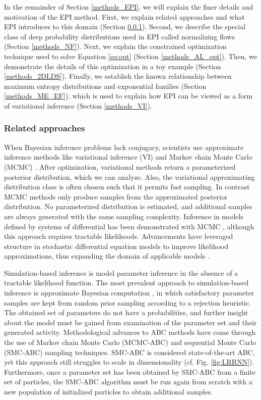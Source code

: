 \documentclass[11pt]{article}
\begin{document}
In the remainder of Section \ref{methods_EPI}, we will explain the finer details and motivation of the EPI method. 
First, we explain related approaches and what EPI introduces to this domain (Section \ref{methods_related}).
Second, we describe the special class of deep probability distributions used in EPI called normalizing flows (Section \ref{methods_NF}).  
Next, we explain the constrained optimization technique used to solve Equation \ref{eq:opt} (Section \ref{methods_AL_opt}).
Then, we demonstrate the details of this optimization in a toy example (Section \ref{methods_2DLDS}).
Finally, we establish the known relationship between maximum entropy distributions and exponential families (Section \ref{methods_ME_EF}), which is used to explain how EPI can be viewed as a form of variational inference (Section \ref{methods_VI}).

 \subsubsection{Related approaches}\label{methods_related}
 When Bayesian inference problems lack conjugacy, scientists use approximate inference methods like variational inference (VI) \cite{saul1998mean} and Markov chain Monte Carlo (MCMC) \cite{metropolis1953equation, hastings1970monte}. 
After optimization, variational methods return a parameterized posterior distribution, which we can analyze.
Also, the variational approximating distribution class is often chosen such that it permits fast sampling.
In contrast MCMC methods only produce samples from the approximated posterior distribution.
No parameterized distribution is estimated, and additional samples are always generated with the same sampling complexity.
Inference in models defined by systems of differential has been demonstrated with MCMC \cite{girolami2011riemann}, although this approach requires tractable likelihoods.
Advancements have leveraged structure in stochastic differential equation models to improve likelihood approximations, thus expanding the domain of applicable models \cite{golightly2011bayesian}.
 
Simulation-based inference \cite{cranmer2020frontier} is model parameter inference in the absence of a tractable likelihood function.
The most prevalent approach to simulation-based inference is approximate Bayesian computation \cite{beaumont2002approximate}, in which satisfactory parameter samples are kept from random prior sampling according to a rejection heuristic.
The obtained set of parameters do not have a probabilities, and further insight about the model must be gained from examination of the parameter set and their generated activity.
Methodological advances to ABC methods have come through the use of Markov chain Monte Carlo (MCMC-ABC) \cite{marjoram2003markov} and sequential Monte Carlo (SMC-ABC) \cite{sisson2007sequential} sampling techniques.
SMC-ABC is considered state-of-the-art ABC, yet this approach still struggles to scale in dimensionality (cf. Fig. \ref{fig:LRRNN}).
Furthermore, once a parameter set has been obtained by SMC-ABC from a finite set of particles, the SMC-ABC algorithm must be run again from scratch with a new population of initialized particles to obtain additional samples.
\end{document}

